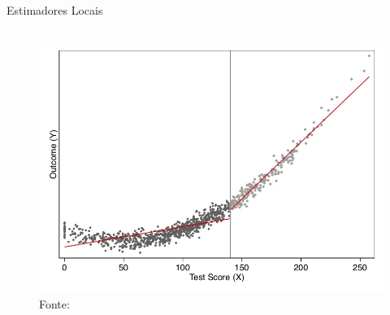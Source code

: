 \documentclass[aspectratio=1610, 10pt]{beamer}
\begin{document}
\begin{frame}{Estimadores Locais}
\begin{columns}[T]
\begin{column}{0.48\linewidth}
            \begin{figure}
                \centering
                \includegraphics[width=\linewidth]{fig/NonLinear.jpg}
                \tiny{Fonte: \cite{cunningham2021causal}}
            \end{figure}

        \end{column}
	\end{columns}
\end{frame}
\end{document}
